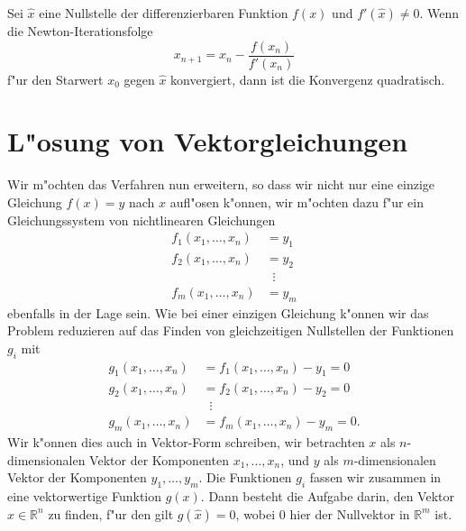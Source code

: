 \begin{satz}
Sei $\hat{x}$ eine Nullstelle der differenzierbaren Funktion $f(x)$ und
$f'(\hat{x})\ne 0$.
Wenn die Newton-Iterationsfolge
\[
x_{n+1}=x_n-\frac{f(x_n)}{f'(x_n)}
\]
f"ur den Starwert  $x_0$ gegen $\hat{x}$ konvergiert,
dann ist die Konvergenz quadratisch.
\end{satz}

\section{L"osung von Vektorgleichungen\label{section:newton:vektor}}
Wir m"ochten das Verfahren nun erweitern, so dass wir nicht nur eine
einzige Gleichung $f(x)=y$ nach $x$ aufl"osen k"onnen, wir m"ochten dazu 
f"ur ein Gleichungssystem von nichtlinearen Gleichungen
\begin{align*}
f_1(x_1,\dots,x_n)&=y_1\\
f_2(x_1,\dots,x_n)&=y_2\\
&\;\;\vdots\\
f_m(x_1,\dots,x_n)&=y_m
\end{align*}
ebenfalls in der Lage sein.
Wie bei einer einzigen Gleichung k"onnen wir das Problem reduzieren
auf das Finden von gleichzeitigen Nullstellen der Funktionen $g_i$ mit
\begin{align*}
g_1(x_1,\dots,x_n)&=f_1(x_1,\dots,x_n)-y_1=0\\
g_2(x_1,\dots,x_n)&=f_2(x_1,\dots,x_n)-y_2=0\\
&\;\;\vdots\\
g_m(x_1,\dots,x_n)&=f_m(x_1,\dots,x_n)-y_m=0.
\end{align*}
Wir k"onnen dies auch in Vektor-Form schreiben,
wir betrachten $x$ als $n$-dimensionalen Vektor der Komponenten
$x_1,\dots,x_n$, und $y$ als $m$-dimensionalen Vektor der Komponenten
$y_1,\dots,y_m$.
Die Funktionen $g_i$ fassen wir zusammen in eine vektorwertige Funktion
$g(x)$.
Dann besteht die Aufgabe darin, den Vektor $\hat{x}\in\mathbb R^n$ zu
finden, f"ur den  gilt $g(\hat{x})=0$, wobei $0$ hier der Nullvektor
in $\mathbb R^m$ ist.

